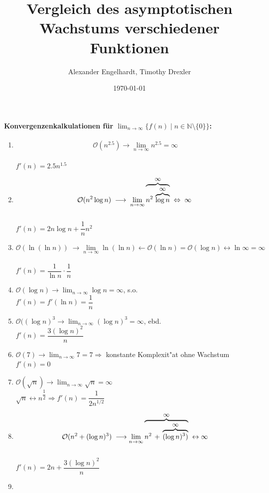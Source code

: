 \documentclass[a4paper,12pt]{article}
\title{Vergleich des asymptotischen Wachstums verschiedener Funktionen}
\author{Alexander Engelhardt, Timothy Drexler}
\date{\today}
\begin{document}
	\maketitle
	\paragraph{Konvergenzenkalkulationen für $\lim_{n\to\infty}\{f(n) \mid n \in \mathbb{N} \setminus{\{0\}}\}$:}
	\begin{enumerate}
		\item 
		\[
			\mathcal{O}(n^{2.5}) \rightarrow \lim_{n\to\infty}n^{2.5} = \infty
		\]\\
		$f'(n) = 2.5n^{1.5}$
		\item 
		\[
			\mathcal{O}(n^2\log n) \; \longrightarrow\; \lim_{n\to\infty}
			\overbrace{%
				n^2 \,
				\overbrace{\log n}^{\text{\small$\infty$}}
				}^{\text{\small$\infty$}} 
				\; \Leftrightarrow\; \infty\ 
		\]\\
		$f'(n) = 2n\log n + \dfrac{1}{n}n^2$
		\item 
		\[
			\mathcal{O}(\ln{(\ln{n})}) \; \longrightarrow \lim_{n\to\infty}\ln{(\ln{n})} \leftarrow \mathcal{O}(\ln n) = \mathcal{O}(\log n) \leftrightarrow \ln \infty = \infty 
		\]\\
		$f'(n) = \dfrac{1}{\ln n}\cdot\dfrac{1}{n}$
		\item $\mathcal{O}(\log{n}) \rightarrow \lim_{n\to\infty}\log{n} = \infty$, s.o.\\
			  $f'(n) = f'(\ln n) = \dfrac{1}{n}$
		\item $\mathcal{O}((\log{n})^3 \rightarrow \lim_{n\to\infty}(\log{n})^3 = \infty$, ebd.\\
			  $f'(n) = \dfrac{3(\log n)^2}{n}$
		\item $\mathcal{O}(7) \rightarrow \lim_{n\to\infty}7 = 7 \Rightarrow$ konstante Komplexit"at ohne Wachstum\\
		$f'(n) = 0$
		\item $\mathcal{O}(\sqrt{n}) \rightarrow \lim_{n\to\infty}\sqrt{n} = \infty$\\
			  $\sqrt{n} \leftrightarrow n^{\dfrac{1}{2}} \Rightarrow f'(n) = \dfrac{1}{2n^{1/2}}$
		\item 
		\[
			\mathcal{O}(n^2 + (\log{n})^3) \; \longrightarrow \lim_{n\to\infty}
			\overbrace{%
				n^2 \,
				+ \,
				\overbrace{(\log{n})^3)}^{\text{\small$\infty$}}
			}^{\text{\small$\infty$}} \; \leftrightarrow \infty
		\]\\
		$f'(n) = 2n + \dfrac{3(\log n)^2}{n}$
		\item 

\end{enumerate}
\end{document}
